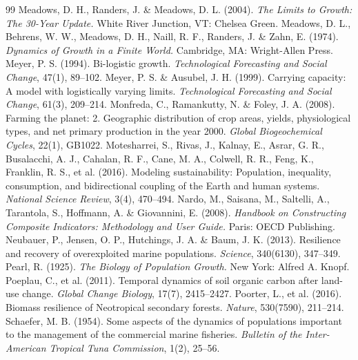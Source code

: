 \begin{thebibliography}{99}
 Meadows, D. H., Randers, J. \& Meadows, D. L. (2004). \emph{The Limits to Growth: The 30-Year Update.} White River Junction, VT: Chelsea Green.
 Meadows, D. L., Behrens, W. W., Meadows, D. H., Naill, R. F., Randers, J. \& Zahn, E. (1974). \emph{Dynamics of Growth in a Finite World.} Cambridge, MA: Wright-Allen Press.
 Meyer, P. S. (1994). Bi-logistic growth. \emph{Technological Forecasting and Social Change}, 47(1), 89--102.
 Meyer, P. S. \& Ausubel, J. H. (1999). Carrying capacity: A model with logistically varying limits. \emph{Technological Forecasting and Social Change}, 61(3), 209--214.
 Monfreda, C., Ramankutty, N. \& Foley, J. A. (2008). Farming the planet: 2. Geographic distribution of crop areas, yields, physiological types, and net primary production in the year 2000. \emph{Global Biogeochemical Cycles}, 22(1), GB1022.
 Motesharrei, S., Rivas, J., Kalnay, E., Asrar, G. R., Busalacchi, A. J., Cahalan, R. F., Cane, M. A., Colwell, R. R., Feng, K., Franklin, R. S., et al. (2016). Modeling sustainability: Population, inequality, consumption, and bidirectional coupling of the Earth and human systems. \emph{National Science Review}, 3(4), 470--494.
 Nardo, M., Saisana, M., Saltelli, A., Tarantola, S., Hoffmann, A. \& Giovannini, E. (2008). \emph{Handbook on Constructing Composite Indicators: Methodology and User Guide.} Paris: OECD Publishing.
 Neubauer, P., Jensen, O. P., Hutchings, J. A. \& Baum, J. K. (2013). Resilience and recovery of overexploited marine populations. \emph{Science}, 340(6130), 347--349.
 Pearl, R. (1925). \emph{The Biology of Population Growth.} New York: Alfred A. Knopf.
 Poeplau, C., et al. (2011). Temporal dynamics of soil organic carbon after land-use change. \emph{Global Change Biology}, 17(7), 2415--2427.
 Poorter, L., et al. (2016). Biomass resilience of Neotropical secondary forests. \emph{Nature}, 530(7590), 211--214.
 Schaefer, M. B. (1954). Some aspects of the dynamics of populations important to the management of the commercial marine fisheries. \emph{Bulletin of the Inter-American Tropical Tuna Commission}, 1(2), 25--56.

\end{thebibliography}
